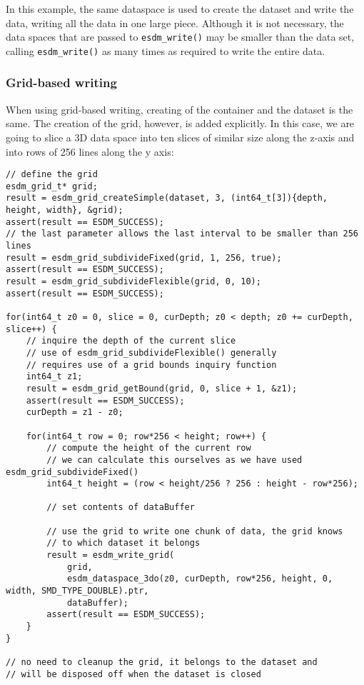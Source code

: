 In this example, the same dataspace is used to create the dataset and write the data, writing all the data in one large piece. 
Although it is not necessary, the data spaces that are passed to \lstinline|esdm_write()| may be smaller than the data set, calling \lstinline|esdm_write()| as many times as required to write the entire data.

\subsubsection{Grid-based writing}
When using grid-based writing, creating of the container and the dataset is the same. 
The creation of the grid, however, is added explicitly. 
In this case, we are going to slice a 3D data space into ten slices of similar size along the z-axis and into rows of 256 lines along the y axis:

\begin{lstlisting}
// define the grid
esdm_grid_t* grid;
result = esdm_grid_createSimple(dataset, 3, (int64_t[3]){depth, height, width}, &grid);
assert(result == ESDM_SUCCESS);
// the last parameter allows the last interval to be smaller than 256 lines
result = esdm_grid_subdivideFixed(grid, 1, 256, true);  
assert(result == ESDM_SUCCESS);
result = esdm_grid_subdivideFlexible(grid, 0, 10);
assert(result == ESDM_SUCCESS);

for(int64_t z0 = 0, slice = 0, curDepth; z0 < depth; z0 += curDepth, slice++) {
    // inquire the depth of the current slice
    // use of esdm_grid_subdivideFlexible() generally 
    // requires use of a grid bounds inquiry function
    int64_t z1;
    result = esdm_grid_getBound(grid, 0, slice + 1, &z1);
    assert(result == ESDM_SUCCESS);
    curDepth = z1 - z0;

    for(int64_t row = 0; row*256 < height; row++) {
        // compute the height of the current row
        // we can calculate this ourselves as we have used esdm_grid_subdivideFixed()
        int64_t height = (row < height/256 ? 256 : height - row*256);

        // set contents of dataBuffer

        // use the grid to write one chunk of data, the grid knows 
        // to which dataset it belongs
        result = esdm_write_grid(
            grid, 
            esdm_dataspace_3do(z0, curDepth, row*256, height, 0, width, SMD_TYPE_DOUBLE).ptr, 
            dataBuffer);
        assert(result == ESDM_SUCCESS);
    }
}

// no need to cleanup the grid, it belongs to the dataset and 
// will be disposed off when the dataset is closed
\end{lstlisting}

